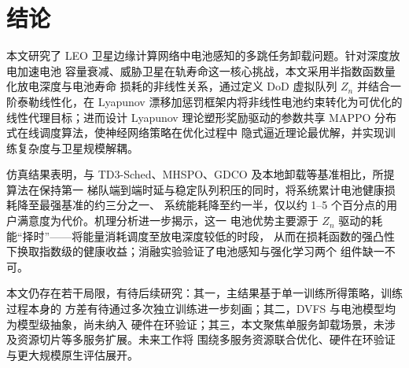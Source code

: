 \documentclass[a4paper,11pt]{article}
\begin{document}
\section{结论}
\label{sec:conclusion}

本文研究了 LEO 卫星边缘计算网络中电池感知的多跳任务卸载问题。针对深度放电加速电池
容量衰减、威胁卫星在轨寿命这一核心挑战，本文采用半指数函数量化放电深度与电池寿命
损耗的非线性关系，通过定义 DoD 虚拟队列 $Z_n$ 并结合一阶泰勒线性化，在 Lyapunov
漂移加惩罚框架内将非线性电池约束转化为可优化的线性代理目标；进而设计 Lyapunov
理论塑形奖励驱动的参数共享 MAPPO 分布式在线调度算法，使神经网络策略在优化过程中
隐式逼近理论最优解，并实现训练复杂度与卫星规模解耦。

仿真结果表明，与 TD3-Sched、MHSPO、GDCO 及本地卸载等基准相比，所提算法在保持第一
梯队端到端时延与稳定队列积压的同时，将系统累计电池健康损耗降至最强基准的约三分之一、
系统能耗降至约一半，仅以约 1--5 个百分点的用户满意度为代价。机理分析进一步揭示，这一
电池优势主要源于 $Z_n$ 驱动的耗能``择时''——将能量消耗调度至放电深度较低的时段，
从而在损耗函数的强凸性下换取指数级的健康收益；消融实验验证了电池感知与强化学习两个
组件缺一不可。

本文仍存在若干局限，有待后续研究：其一，主结果基于单一训练所得策略，训练过程本身的
方差有待通过多次独立训练进一步刻画；其二，DVFS 与电池模型均为模型级抽象，尚未纳入
硬件在环验证；其三，本文聚焦单服务卸载场景，未涉及资源切片等多服务扩展。未来工作将
围绕多服务资源联合优化、硬件在环验证与更大规模原生评估展开。
\end{document}
